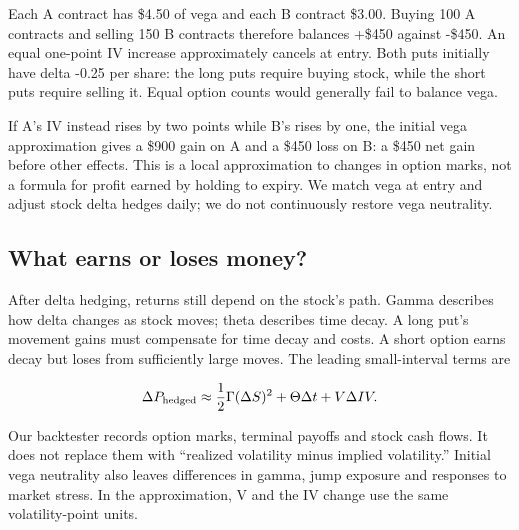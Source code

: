 Each A contract has \$4.50 of vega and each B contract \$3.00. Buying 100 A contracts and selling 150 B contracts therefore balances +\$450 against -\$450. An equal one-point IV increase approximately cancels at entry. Both puts initially have delta -0.25 per share: the long puts require buying stock, while the short puts require selling it. Equal option counts would generally fail to balance vega.


If A's IV instead rises by two points while B's rises by one, the initial vega approximation gives a \$900 gain on A and a \$450 loss on B: a \$450 net gain before other effects. This is a local approximation to changes in option marks, not a formula for profit earned by holding to expiry. We match vega at entry and adjust stock delta hedges daily; we do not continuously restore vega neutrality.


\subsection*{What earns or loses money?}

After delta hedging, returns still depend on the stock's path. Gamma describes how delta changes as stock moves; theta describes time decay. A long put's movement gains must compensate for time decay and costs. A short option earns decay but loses from sufficiently large moves. The leading small-interval terms are


\begin{equation*}\Delta P_{\rm hedged}\approx\frac{1}{2}\Gamma(\Delta S)^2+\Theta\Delta t+V\Delta IV.\end{equation*}

Our backtester records option marks, terminal payoffs and stock cash flows. It does not replace them with ``realized volatility minus implied volatility.'' Initial vega neutrality also leaves differences in gamma, jump exposure and responses to market stress. In the approximation, V and the IV change use the same volatility-point units.
